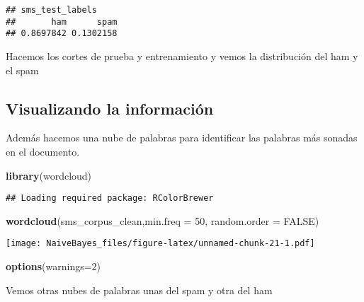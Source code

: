 \documentclass[]{article}
\newenvironment{Shaded}{\begin{snugshade}}{\end{snugshade}}
\newcommand{\KeywordTok}[1]{\textcolor[rgb]{0.13,0.29,0.53}{\textbf{#1}}}
\newcommand{\DataTypeTok}[1]{\textcolor[rgb]{0.13,0.29,0.53}{#1}}
\newcommand{\DecValTok}[1]{\textcolor[rgb]{0.00,0.00,0.81}{#1}}
\newcommand{\FloatTok}[1]{\textcolor[rgb]{0.00,0.00,0.81}{#1}}
\newcommand{\StringTok}[1]{\textcolor[rgb]{0.31,0.60,0.02}{#1}}
\newcommand{\OtherTok}[1]{\textcolor[rgb]{0.56,0.35,0.01}{#1}}
\newcommand{\OperatorTok}[1]{\textcolor[rgb]{0.81,0.36,0.00}{\textbf{#1}}}
\newcommand{\NormalTok}[1]{#1}
\begin{document}
\begin{verbatim}
## sms_test_labels
##       ham      spam 
## 0.8697842 0.1302158
\end{verbatim}

Hacemos los cortes de prueba y entrenamiento y vemos la distribución del
ham y el spam

\subsection{Visualizando la
información}\label{visualizando-la-informacion}

Además hacemos una nube de palabras para identificar las palabras más
sonadas en el documento.

\begin{Shaded}
\begin{Highlighting}[]
\KeywordTok{library}\NormalTok{(wordcloud)}
\end{Highlighting}
\end{Shaded}

\begin{verbatim}
## Loading required package: RColorBrewer
\end{verbatim}

\begin{Shaded}
\begin{Highlighting}[]
\KeywordTok{wordcloud}\NormalTok{(sms_corpus_clean,}\DataTypeTok{min.freq =} \DecValTok{50}\NormalTok{, }\DataTypeTok{random.order =} \OtherTok{FALSE}\NormalTok{)}
\end{Highlighting}
\end{Shaded}

\texttt{[image: NaiveBayes\_files/figure-latex/unnamed-chunk-21-1.pdf]}

\begin{Shaded}
\begin{Highlighting}[]
\KeywordTok{options}\NormalTok{(}\DataTypeTok{warnings=}\DecValTok{2}\NormalTok{) }
\end{Highlighting}
\end{Shaded}

Vemos otras nubes de palabras unas del spam y otra del ham

\begin{Shaded}
\end{Shaded}
\end{document}
